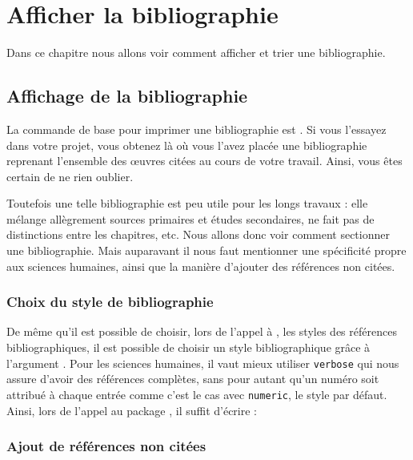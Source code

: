 \chapter{Afficher la bibliographie}

\begin{intro}

Dans ce chapitre nous allons voir comment afficher et trier une bibliographie.
\end{intro}


\section{Affichage de la bibliographie}

La commande de base  pour imprimer une bibliographie est . Si vous l'essayez dans votre projet, vous obtenez là où vous l'avez placée une bibliographie reprenant l'ensemble des œuvres  citées au cours de votre travail. Ainsi, vous êtes certain de ne rien oublier.

Toutefois une telle bibliographie est peu utile pour les longs travaux : elle mélange allègrement sources primaires et études secondaires, ne fait pas de distinctions entre les chapitres, etc. Nous allons donc voir  comment sectionner une bibliographie. Mais auparavant il nous faut mentionner une spécificité propre aux sciences humaines, ainsi que la manière d'ajouter des références non citées.



\subsection{Choix du style de bibliographie}

De même qu'il est possible de choisir, lors de l'appel à , les styles des références bibliographiques, il est possible de choisir un style bibliographique grâce à l'argument . Pour les sciences humaines, il vaut mieux utiliser \verb|verbose| qui nous assure d'avoir des références complètes, sans pour autant qu'un numéro soit attribué à chaque entrée comme c'est le cas avec \verb|numeric|, le style par défaut.
Ainsi, lors de l'appel au package , il suffit d'écrire :

\begin{latexcode}
\usepackage[bibstyle=verbose,...]{biblatex}
\end{latexcode}

\subsection{Ajout de références non citées}

